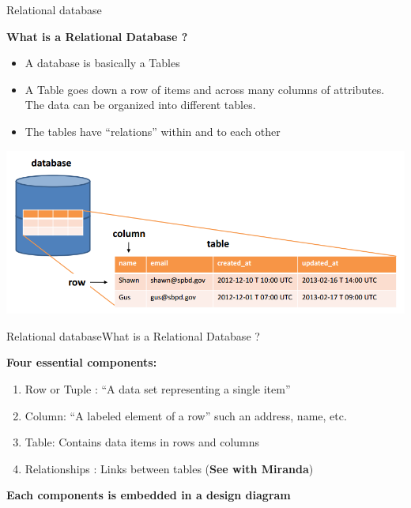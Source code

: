 \documentclass{eecslides}
\begin{document}
\begin{frame}{Relational database}

\textbf{What is a Relational Database ?}
		 \begin{itemize}
			 \item A database is basically a Tables 
			\item A Table goes down a row of items and across many columns of attributes. The data can be organized into different tables.
			\item The tables have “relations” within and to each other
		 \end{itemize}

		\vfill

		\begin{center}
		 \includegraphics[width=.8\paperwidth]{relational-databases-for-dummies-fig1.png}
		\end{center}



\end{frame}


\begin{frame}{Relational database}{What is a Relational Database ?}

\textbf{Four essential components:}
		 \begin{enumerate}
			 \item Row or Tuple : “A data set representing a single item” 
			\item Column: “A labeled element of a row” such an address, name, etc.
			\item Table: Contains data items in rows and columns
			\item Relationships : Links between tables (\textbf{See with Miranda})
		 \end{enumerate}

	\textbf{Each components is embedded in a design diagram}


\end{frame}
\end{document}
